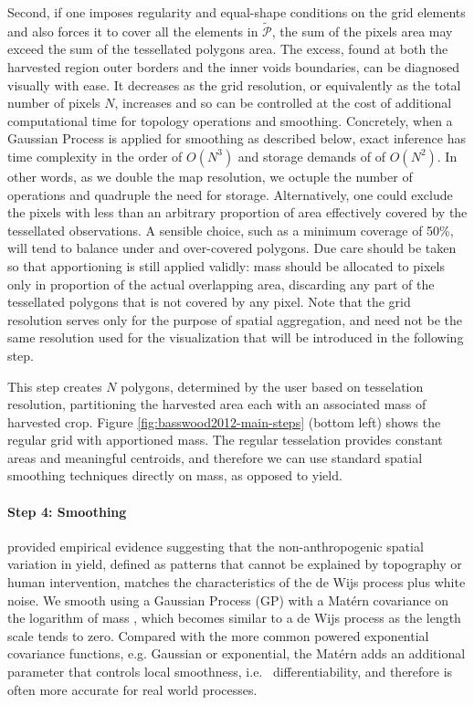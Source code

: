 \documentclass[12pt]{article}
\begin{document}
Second, if one imposes regularity
and equal-shape conditions on the grid elements and also forces it to
cover all the elements in $\tilde{\mathcal{P}}$, the sum of the
pixels area may exceed the sum of the tessellated polygons area. The
excess, found at both the harvested region outer borders and the inner
voids boundaries, can be diagnosed visually with ease. It decreases as
the grid resolution, or equivalently as the total number of pixels
$N$, increases and so can be controlled at the cost of additional
computational time for topology operations and smoothing. %
Concretely, when a Gaussian Process is applied for smoothing as
described below, exact inference has time complexity in the order of
$O(N^3)$ and storage demands of of $O(N^2)$. In other words, as we
double the map resolution, we octuple the number of operations and
quadruple the need for storage.  Alternatively, one could exclude the
pixels with less than an arbitrary proportion of area effectively
covered by the tessellated observations. A sensible choice, such as a
minimum coverage of 50\%, will tend to balance under and over-covered
polygons. Due care should be taken so that apportioning is still
applied validly: mass should be allocated to pixels only in proportion
of the actual overlapping area, discarding any part of the tessellated
polygons that is not covered by any pixel. Note that the grid
resolution serves only for the purpose of spatial aggregation, and
need not be the same resolution used for the visualization that will
be introduced in the following step.

This step creates $N$ polygons, determined by the user based on
tesselation resolution, partitioning the harvested area each with an
associated mass of harvested crop. Figure
\ref{fig:basswood2012-main-steps} (bottom left) shows the regular grid
with apportioned mass. The regular tesselation provides constant areas
and meaningful centroids, and therefore we can use standard spatial
smoothing techniques directly on mass, as opposed to yield.

\paragraph{Step 4: Smoothing} \cite{McCullagh2006} provided empirical
evidence suggesting that the non-anthropogenic spatial variation in
yield, defined as patterns that cannot be explained by topography or
human intervention, matches the characteristics of the de Wijs process
plus white noise. We smooth using a Gaussian Process (GP) with a
Mat\'ern covariance on the logarithm of mass
\citep{handcock1993bayesian,gutt2006studies}, which becomes similar to
a de Wijs process as the length scale tends to zero. Compared with the
more common powered exponential covariance functions, e.g. Gaussian or
exponential, the Mat\'ern adds an additional parameter that controls
local smoothness, i.e. \ differentiability, and therefore is often
more accurate for real world processes.
\end{document}
